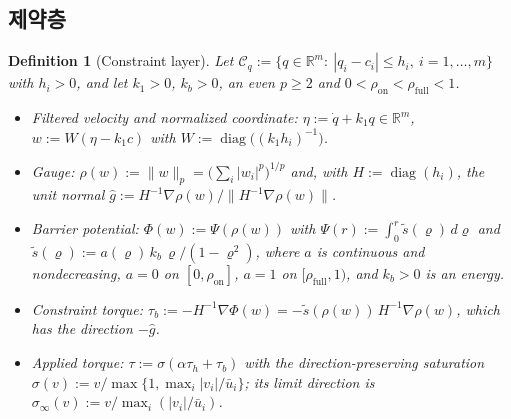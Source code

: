 \documentclass[11pt]{article}\usepackage[margin=1in]{geometry}\usepackage{amsmath,amssymb,amsthm,mathtools}\usepackage{graphicx}\graphicspath{{figures/}{../figures/}{figs/}{./}}\usepackage{enumitem}\usepackage{hyperref}\usepackage{cleveref}\usepackage{tikz}\usetikzlibrary{arrows.meta,positioning,calc,shapes.geometric}\usepackage{float}\usepackage{rotating}\usepackage[most]{tcolorbox}\usepackage{kotex}\usepackage{booktabs}\usepackage{longtable}\emergencystretch=1.6em\tolerance=2000 \crefname{assumption}{Assumption}{Assumptions}\Crefname{assumption}{Assumption}{Assumptions}\crefname{definition}{Definition}{Definitions}\Crefname{definition}{Definition}{Definitions}\crefname{proposition}{Proposition}{Propositions}\Crefname{proposition}{Proposition}{Propositions}\crefname{fact}{Fact}{Facts}\Crefname{fact}{Fact}{Facts} \newtheorem{assumption}{Assumption}\newtheorem{definition}{Definition}\newtheorem{lemma}{Lemma}\newtheorem{proposition}{Proposition}\newtheorem{theorem}{Theorem}\newtheorem{corollary}{Corollary}\newtheorem{fact}{Fact}\theoremstyle{remark}\newtheorem{remark}{Remark} \newcommand{\R}{\mathbb{R}}\newcommand{\xb}{\bar x}\newcommand{\Ab}{\bar A}\newcommand{\By}{\bar B_y}\newcommand{\U}{\mathcal U}\newcommand{\Z}{\mathcal Z}
\begin{document}
\subsection{제약층}

\begin{definition}[Constraint layer]
\label{def:cons3}
Let $\mathcal C_q:=\{q\in\R^m:\ |q_i-c_i|\le h_i,\ i=1,\dots,m\}$ with $h_i>0$, and let $k_1>0$, $k_b>0$, an even $p\ge2$ and $0<\rho_{\mathrm{on}}<\rho_{\mathrm{full}}<1$.
\begin{itemize}
\item Filtered velocity and normalized coordinate: $\eta:=\dot q+k_1q\in\R^m$, $w:=W(\eta-k_1c)$ with $W:=\operatorname{diag}\big((k_1h_i)^{-1}\big)$.
\item Gauge: $\rho(w):=\|w\|_p=\big(\sum_i|w_i|^p\big)^{1/p}$ and, with $H:=\operatorname{diag}(h_i)$, the unit normal $\hat g:=H^{-1}\nabla\rho(w)/\|H^{-1}\nabla\rho(w)\|$.
\item Barrier potential: $\Phi(w):=\Psi(\rho(w))$ with $\Psi(r):=\int_0^r\tilde s(\varrho)\,d\varrho$ and $\tilde s(\varrho):=a(\varrho)\,k_b\,\varrho/(1-\varrho^2)$, where $a$ is continuous and nondecreasing, $a=0$ on $[0,\rho_{\mathrm{on}}]$, $a=1$ on $[\rho_{\mathrm{full}},1)$, and $k_b>0$ is an energy.
\item Constraint torque: $\tau_b:=-H^{-1}\nabla\Phi(w)=-\tilde s(\rho(w))\,H^{-1}\nabla\rho(w)$, which has the direction $-\hat g$.
\item Applied torque: $\tau:=\sigma(\alpha\tau_h+\tau_b)$ with the direction-preserving saturation $\sigma(v):=v/\max\{1,\max_i|v_i|/\bar u_i\}$; its limit direction is $\sigma_\infty(v):=v/\max_i(|v_i|/\bar u_i)$.
\end{itemize}
\end{definition}
\end{document}
